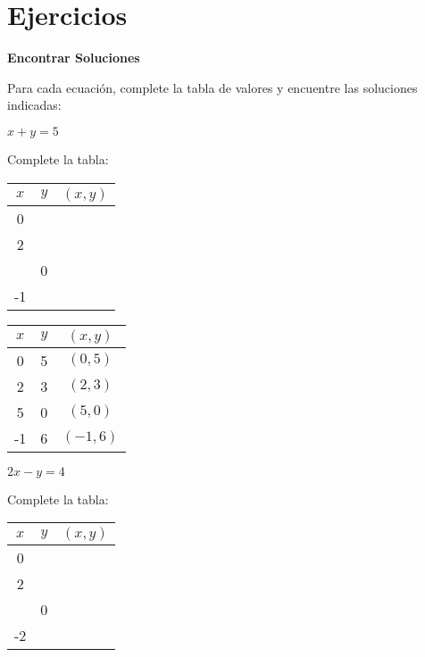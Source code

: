 
\section{Ejercicios}

\begin{exercise}
\textbf{Encontrar Soluciones}

Para cada ecuación, complete la tabla de valores y encuentre las soluciones indicadas:

\problem $x + y = 5$

Complete la tabla:
\begin{center}
\begin{tabular}{|c|c|c|}
\hline
$x$ & $y$ & $(x, y)$ \\
\hline
0 & & \\
\hline
2 & & \\
\hline
& 0 & \\
\hline
-1 & & \\
\hline
\end{tabular}
\end{center}

\begin{solucion}
\begin{tabular}{|c|c|c|}
\hline
$x$ & $y$ & $(x, y)$ \\
\hline
0 & 5 & $(0, 5)$ \\
\hline
2 & 3 & $(2, 3)$ \\
\hline
5 & 0 & $(5, 0)$ \\
\hline
-1 & 6 & $(-1, 6)$ \\
\hline
\end{tabular}
\end{solucion}

\problem $2x - y = 4$

Complete la tabla:
\begin{center}
\begin{tabular}{|c|c|c|}
\hline
$x$ & $y$ & $(x, y)$ \\
\hline
0 & & \\
\hline
2 & & \\
\hline
& 0 & \\
\hline
-2 & & \\
\hline
\end{tabular}
\end{center}


\end{exercise}
